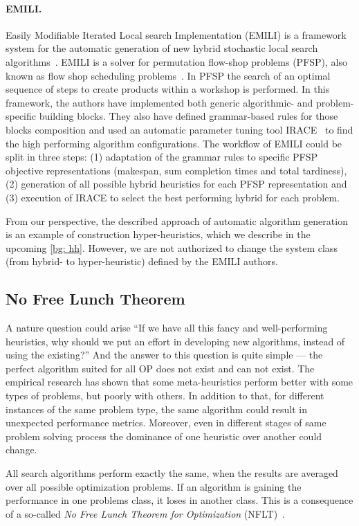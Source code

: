 \paragraph{EMILI.}
Easily Modifiable Iterated Local search Implementation (EMILI) is a framework system for the automatic generation of new hybrid stochastic local search algorithms~\cite{pagnozzi2019automatic}. EMILI is a solver for permutation flow-shop problems (PFSP), also known as flow shop scheduling problems~\cite{reza2005flowshop}. In PFSP the search of an optimal sequence of steps to create products within a workshop is performed.
In this framework, the authors have implemented both generic algorithmic- and problem-specific building blocks. They also have defined grammar-based rules for those blocks composition and used an automatic parameter tuning tool IRACE~\cite{lopez2016irace} to find the high performing algorithm configurations. The workflow of EMILI could be split in three steps: (1) adaptation of the grammar rules to specific PFSP objective representations (makespan, sum completion times and total tardiness), (2) generation of all possible hybrid heuristics for each PFSP representation and (3) execution of IRACE to select the best performing hybrid for each problem. 

From our perspective, the described approach of automatic algorithm generation is an example of construction hyper-heuristics, which we describe in the upcoming \cref{bg: hh}. However, we are not authorized to change the system class (from hybrid- to hyper-heuristic) defined by the EMILI authors.


\subsection{No Free Lunch Theorem}
A nature question could arise ``If we have all this fancy and well-performing heuristics, why should we put an effort in developing new algorithms, instead of using the existing?'' And the answer to this question is quite simple — the perfect algorithm suited for all OP does not exist and can not exist. 
The empirical research has shown that some meta-heuristics perform better with some types of problems, but poorly with others. In addition to that, for different instances of the same problem type, the same algorithm could result in unexpected performance metrics. Moreover, even in different stages of same problem solving process the dominance of one heuristic over another could change. 

All search algorithms perform exactly the same, when the results are averaged over all possible optimization problems. If an algorithm is gaining the performance in one problems class, it loses in another class. This is a consequence of a so-called \emph{No Free Lunch Theorem for Optimization} (NFLT)~\cite{wolpert1997no}.


